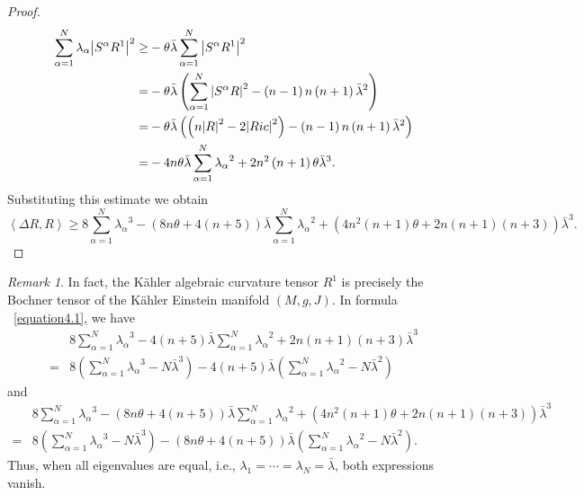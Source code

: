 \documentclass{amsart}
\theoremstyle{definition}
\theoremstyle{remark}
\newtheorem{remark}[theorem]{Remark}
\numberwithin{equation}{section}
\begin{document}
\begin{proof}
\begin{align*}
  \sum\limits_{\alpha  = 1}^N {{\lambda _\alpha }{{\left| {{S^\alpha }{R^1}} \right|}^2}}  \ge &  - \theta \bar \lambda \sum\limits_{\alpha  = 1}^N {{{\left| {{S^\alpha }{R^1}} \right|}^2}}  \hfill \\
   =&  - \theta \bar \lambda \left( {\sum\limits_{\alpha  = 1}^N {{{\left| {{S^\alpha }R} \right|}^2}}  - \left( {n - 1} \right)n\left( {n + 1} \right){{\bar \lambda }^2}} \right) \hfill \\
   =&  - \theta \bar \lambda \left( {\left( {n{{\left| R \right|}^2} - 2{{\left| {Ric} \right|}^2}} \right) - \left( {n - 1} \right)n\left( {n + 1} \right){{\bar \lambda }^2}} \right) \hfill \\
   =&  - 4n\theta \bar \lambda \sum\limits_{\alpha  = 1}^N {{\lambda _\alpha }^2}  + 2{n^2}\left( {n + 1} \right)\theta {{\bar \lambda }^3}.
\end{align*}
Substituting this estimate we obtain
$$\left\langle {\Delta R,R} \right\rangle
\ge 8\sum\limits_{\alpha  = 1}^N {{\lambda _\alpha }^3}  - \left( {8n\theta  + 4\left( {n + 5} \right)} \right)\bar \lambda \sum\limits_{\alpha  = 1}^N {{\lambda _\alpha }^2}  + \left( {4{n^2}\left( {n + 1} \right)\theta  + 2n\left( {n + 1} \right)\left( {n + 3} \right)} \right){{\bar \lambda }^3} .$$
\end{proof}

\begin{remark}
\label{remark4.7}
In fact, the K{\"a}hler algebraic curvature tensor $R^1$ is precisely the Bochner tensor of the K{\"a}hler Einstein manifold $\left( M,g,J \right)$. In formula ~\eqref{equation4.1}, we have
\begin{align*}
&8\sum\limits_{\alpha  = 1}^N {{\lambda _\alpha }^3}  - 4\left( {n + 5} \right)\bar \lambda \sum\limits_{\alpha  = 1}^N {{\lambda _\alpha }^2}  + 2n\left( {n + 1} \right)\left( {n + 3} \right){{\bar \lambda }^3}\\
 =& 8\left( {\sum\limits_{\alpha  = 1}^N {{\lambda _\alpha }^3}  - N{{\bar \lambda }^3}} \right) - 4\left( {n + 5} \right)\bar \lambda \left( {\sum\limits_{\alpha  = 1}^N {{\lambda _\alpha }^2}  - N{{\bar \lambda }^2}} \right)
\end{align*}
and
\begin{align*}
&8\sum\limits_{\alpha  = 1}^N {{\lambda _\alpha }^3}  - \left( {8n\theta  + 4\left( {n + 5} \right)} \right)\bar \lambda \sum\limits_{\alpha  = 1}^N {{\lambda _\alpha }^2}  + \left( {4{n^2}\left( {n + 1} \right)\theta  + 2n\left( {n + 1} \right)\left( {n + 3} \right)} \right){{\bar \lambda }^3}\\
 =& 8\left( {\sum\limits_{\alpha  = 1}^N {{\lambda _\alpha }^3}  - N{{\bar \lambda }^3}} \right) - \left( {8n\theta  + 4\left( {n + 5} \right)} \right)\bar \lambda \left( {\sum\limits_{\alpha  = 1}^N {{\lambda _\alpha }^2}  - N{{\bar \lambda }^2}} \right).
\end{align*}
Thus, when all eigenvalues are equal, i.e., ${\lambda _1} =  \cdots  = {\lambda _N} = \bar \lambda $, both expressions vanish.
\end{remark}
\end{document}
